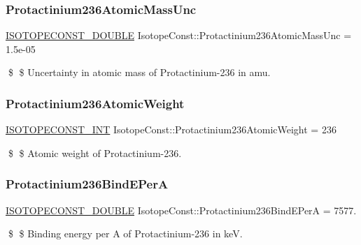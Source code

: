\subsubsection{\texorpdfstring{Protactinium236\+Atomic\+Mass\+Unc}{Protactinium236AtomicMassUnc}}
{\footnotesize\ttfamily \mbox{\hyperlink{group___isotope_const-_macros_ga8f45a7272ce02c0b4c65c44636ed719a}{I\+S\+O\+T\+O\+P\+E\+C\+O\+N\+S\+T\+\_\+\+D\+O\+U\+B\+LE}} Isotope\+Const\+::\+Protactinium236\+Atomic\+Mass\+Unc = 1.\+5e-\/05}

\$ \$ Uncertainty in atomic mass of Protactinium-\/236 in amu. \mbox{\label{group___isotope_const-_protactinium-_pa236_ga32265e6209d0ee831f2b624bd4b67910}} 
\subsubsection{\texorpdfstring{Protactinium236\+Atomic\+Weight}{Protactinium236AtomicWeight}}
{\footnotesize\ttfamily \mbox{\hyperlink{group___isotope_const-_macros_ga5f18360b3e99483a35c32d789e62621c}{I\+S\+O\+T\+O\+P\+E\+C\+O\+N\+S\+T\+\_\+\+I\+NT}} Isotope\+Const\+::\+Protactinium236\+Atomic\+Weight = 236}

\$ \$ Atomic weight of Protactinium-\/236. \mbox{\label{group___isotope_const-_protactinium-_pa236_ga09426fb6571c91de85965207208312e7}} 
\subsubsection{\texorpdfstring{Protactinium236\+Bind\+E\+PerA}{Protactinium236BindEPerA}}
{\footnotesize\ttfamily \mbox{\hyperlink{group___isotope_const-_macros_ga8f45a7272ce02c0b4c65c44636ed719a}{I\+S\+O\+T\+O\+P\+E\+C\+O\+N\+S\+T\+\_\+\+D\+O\+U\+B\+LE}} Isotope\+Const\+::\+Protactinium236\+Bind\+E\+PerA = 7577.}

\$ \$ Binding energy per A of Protactinium-\/236 in keV. \mbox{\label{group___isotope_const-_protactinium-_pa236_gab6aa7c9927e7f782ee567566d5a47910}} 

